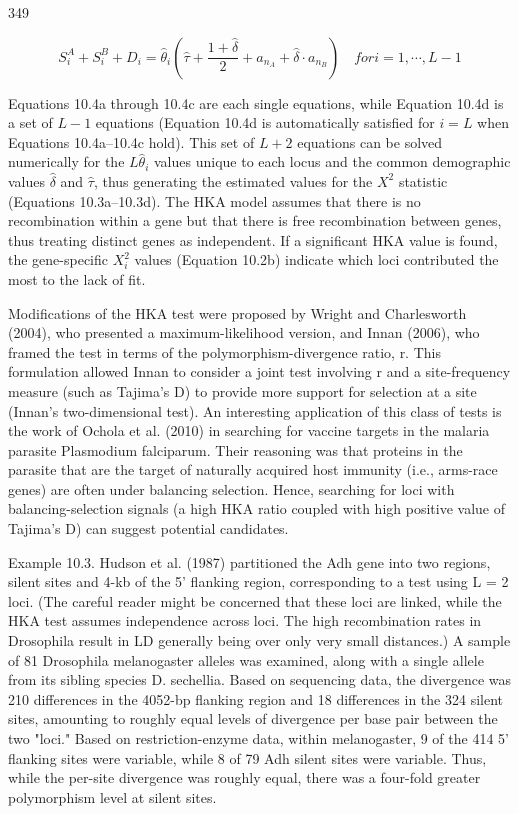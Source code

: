 \documentclass{article}
\begin{document}
349

\begin{equation}
S_{i}^{A}+S_{i}^{B}+D_{i}=\widehat{\theta}_{i}\left(\widehat{\tau}+\frac{1+\widehat{\delta}}{2}+a_{n_{A}}+\widehat{\delta}\cdot a_{n_{B}}\right)\quad for i=1,\cdots,L-1
\tag{10.4d}
\label{eq:10_4d}
\end{equation}

Equations 10.4a through 10.4c are each single equations, while Equation 10.4d is a set of  $ L - 1 $ equations (Equation 10.4d is automatically satisfied for  $ i = L $ when Equations 10.4a–10.4c hold). This set of  $ L + 2 $ equations can be solved numerically for the  $ L \widehat{\theta}_i $ values unique to each locus and the common demographic values  $ \widehat{\delta} $ and  $ \widehat{\tau} $, thus generating the estimated values for the  $ X^2 $ statistic (Equations 10.3a–10.3d). The HKA model assumes that there is no recombination within a gene but that there is free recombination between genes, thus treating distinct genes as independent. If a significant HKA value is found, the gene-specific  $ X_i^2 $ values (Equation 10.2b) indicate which loci contributed the most to the lack of fit.

Modifications of the HKA test were proposed by Wright and Charlesworth (2004), who presented a maximum-likelihood version, and Innan (2006), who framed the test in terms of the polymorphism-divergence ratio, r. This formulation allowed Innan to consider a joint test involving r and a site-frequency measure (such as Tajima's D) to provide more support for selection at a site (Innan's two-dimensional test). An interesting application of this class of tests is the work of Ochola et al. (2010) in searching for vaccine targets in the malaria parasite Plasmodium falciparum. Their reasoning was that proteins in the parasite that are the target of naturally acquired host immunity (i.e., arms-race genes) are often under balancing selection. Hence, searching for loci with balancing-selection signals (a high HKA ratio coupled with high positive value of Tajima's D) can suggest potential candidates.

Example 10.3. Hudson et al. (1987) partitioned the Adh gene into two regions, silent sites and 4-kb of the 5' flanking region, corresponding to a test using L = 2 loci. (The careful reader might be concerned that these loci are linked, while the HKA test assumes independence across loci. The high recombination rates in Drosophila result in LD generally being over only very small distances.) A sample of 81 Drosophila melanogaster alleles was examined, along with a single allele from its sibling species D. sechellia. Based on sequencing data, the divergence was 210 differences in the 4052-bp flanking region and 18 differences in the 324 silent sites, amounting to roughly equal levels of divergence per base pair between the two "loci." Based on restriction-enzyme data, within melanogaster, 9 of the 414 5' flanking sites were variable, while 8 of 79 Adh silent sites were variable. Thus, while the per-site divergence was roughly equal, there was a four-fold greater polymorphism level at silent sites.
\end{document}
